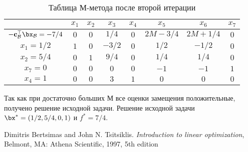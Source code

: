 \documentclass[12pt]{article}
\begin{document}
\begin{table}[!ht]
\centering
\caption{Таблица $М$-метода после второй итерации}
\begin{tabular}{|c|ccccccc|}
\hline
& $x_1$ & $x_2$ & $x_3$ & $x_4$ & $x_5$ & $x_6$ & $x_7$ \\
\hline
$-\mathbf{c}_{\mathcal{B}}^{\top}\bx_{\mathcal{B}} = -7/4$ & $0$ & $0$ & $1/4$ & $0$ & $2M-3/4$ & $2M+1/4$ & $0$ \\
\hline
$x_1 = 1/2$ & $1$ & $0$ & $-3/2$ & $0$ & $1/2$ & $-1/2$ & $0$\\
$x_2 = 5/4$ & $0$ & $1$ & $9/4$ & $0$ & $1/4$ & $1/4$ & $0$\\
$x_7 = 0$ & $0$ & $0$ & $0$ & $0$ & $-1$ & $-1$ & $1$ \\
$x_4 = 1$ & $0$ & $0$ & $3$ & $1$ & $0$ & $0$ & $0$ \\
\hline
\end{tabular}
\label{tab::simplex_36}
\end{table}
\newpage
Так как при достаточно больших $М$ все оценки замещения положительные, получено решение исходной задачи.
Решение исходной задачи $\bx^* = (1/2, 5/4, 0, 1)$ и $f^* = 7/4$.


\begin{thebibliography}{9}

Dimitris Bertsimas and John N. Tsitsiklis. \emph{Introduction to linear optimization}, Belmont, MA: Athena Scientific, 1997, 5th edition

\end{thebibliography}
\end{document}
